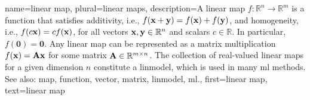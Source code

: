 {name={linear map}, plural={linear maps}, 
	description={A linear \gls{map} $f: \mathbb{R}^n \rightarrow \mathbb{R}^m$ is a \gls{function} that satisfies additivity, i.e.,
		$f({\bf x} + {\bf y}) = f({\bf x}) + f({\bf y})$, and homogeneity, i.e.,
		$f(c{\bf x}) = c f({\bf x})$, for all \glspl{vector} ${\bf x}, {\bf y} \in \mathbb{R}^n$ and scalars $c \in \mathbb{R}$. 
		In particular, $f(\mathbf{0}) = \mathbf{0}$. Any linear \gls{map} can be represented as a \gls{matrix} 
		multiplication $f({\bf x}) = {\bf A} {\bf x}$ for some \gls{matrix} ${\bf A} \in \mathbb{R}^{m \times n}$. 
		The collection of real-valued linear \glspl{map} for a given dimension $n$ constitute a \gls{linmodel}, 
		which is used in many \gls{ml} methods.
		\\
		See also: \gls{map}, \gls{function}, \gls{vector}, \gls{matrix}, \gls{linmodel}, \gls{ml}.},
	first={linear map},
	text={linear map}
}

